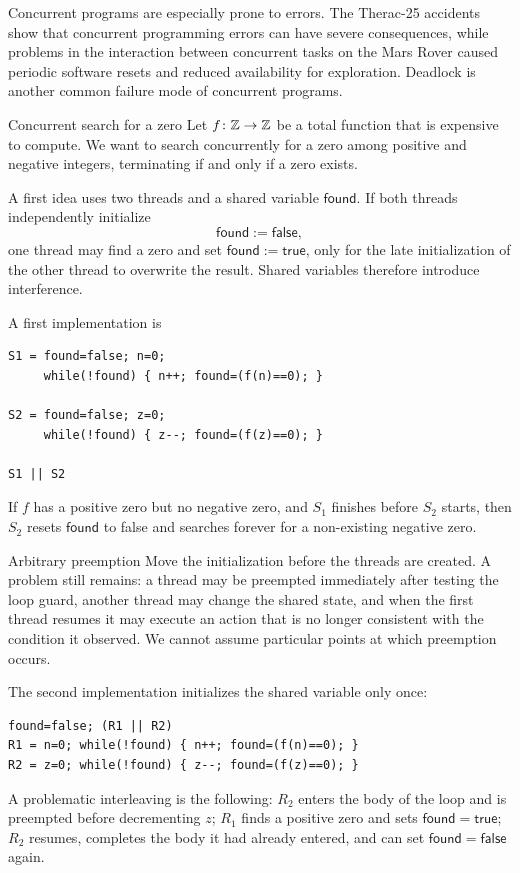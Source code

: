 \documentclass[a4paper]{article}
\begin{document}
Concurrent programs are especially prone to errors.
The Therac-25 accidents show that concurrent programming errors can have severe consequences, while problems in the interaction between concurrent tasks on the Mars Rover caused periodic software resets and reduced availability for exploration. Deadlock is another common failure mode of concurrent programs.

\begin{snippetexample}{Concurrent search for a zero}
    Let \(f\colon\mathbb{Z}\to\mathbb{Z}\) be a total function that is expensive to compute.
    We want to search concurrently for a zero among positive and negative integers, terminating if and only if a zero exists.

    A first idea uses two threads and a shared variable \(\mathsf{found}\). If both threads independently initialize
    \[
        \mathsf{found}:=\mathsf{false},
    \]
    one thread may find a zero and set \(\mathsf{found}:=\mathsf{true}\), only for the late initialization of the other thread to overwrite the result.
    Shared variables therefore introduce interference.
\end{snippetexample}

A first implementation is
\begin{verbatim}
S1 = found=false; n=0;
     while(!found) { n++; found=(f(n)==0); }

S2 = found=false; z=0;
     while(!found) { z--; found=(f(z)==0); }

S1 || S2
\end{verbatim}
If \(f\) has a positive zero but no negative zero, and \(S_1\) finishes before \(S_2\) starts, then \(S_2\) resets \(\mathsf{found}\) to false and searches forever for a non-existing negative zero.

\begin{snippetexample}{Arbitrary preemption}
    Move the initialization before the threads are created.
    A problem still remains: a thread may be preempted immediately after testing the loop guard, another thread may change the shared state, and when the first thread resumes it may execute an action that is no longer consistent with the condition it observed.
    We cannot assume particular points at which preemption occurs.
\end{snippetexample}

The second implementation initializes the shared variable only once:
\begin{verbatim}
found=false; (R1 || R2)
R1 = n=0; while(!found) { n++; found=(f(n)==0); }
R2 = z=0; while(!found) { z--; found=(f(z)==0); }
\end{verbatim}
A problematic interleaving is the following: \(R_2\) enters the body of the loop and is preempted before decrementing \(z\); \(R_1\) finds a positive zero and sets \(\mathsf{found=true}\); \(R_2\) resumes, completes the body it had already entered, and can set \(\mathsf{found=false}\) again.
\end{document}
